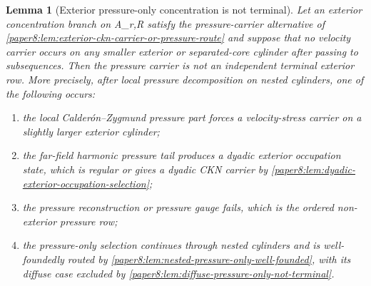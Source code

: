 \documentclass[11pt]{amsart}
\def\({}%
\def\){}%
\theoremstyle{plain}
\newtheorem{lemma}[lemma]{Lemma}
\theoremstyle{definition}
\theoremstyle{remark}
\begin{document}
\begin{lemma}[Exterior pressure-only concentration is not terminal]
\label{paper8:lem:exterior-pressure-only-not-terminal}
Let an exterior concentration branch on \(A_{r,R}\) satisfy the pressure-carrier
alternative of
\cref{paper8:lem:exterior-ckn-carrier-or-pressure-route} and suppose that no
velocity carrier occurs on any smaller exterior or separated-core cylinder
after passing to subsequences.  Then the pressure carrier is not an independent
terminal exterior row.  More precisely, after local pressure decomposition on
nested cylinders, one of the following occurs:
\begin{enumerate}[label=\textup{(\roman*)}]
\item the local Calder\'on--Zygmund pressure part forces a velocity-stress
carrier on a slightly larger exterior cylinder;
\item the far-field harmonic pressure tail produces a dyadic exterior
occupation state, which is regular or gives a dyadic CKN carrier by
\cref{paper8:lem:dyadic-exterior-occupation-selection};
\item the pressure reconstruction or pressure gauge fails, which is the ordered
non-exterior pressure row;
\item the pressure-only selection continues through nested cylinders and is
well-foundedly routed by
\cref{paper8:lem:nested-pressure-only-well-founded}, with its diffuse case
excluded by \cref{paper8:lem:diffuse-pressure-only-not-terminal}.
\end{enumerate}
\end{lemma}
\end{document}
